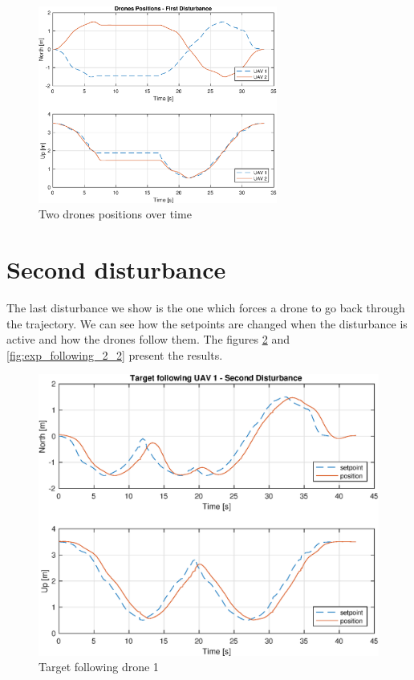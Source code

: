 \begin{figure}
\centering
\includegraphics[width=0.7\textwidth]{chapters/chapter-05/figures/overlapped_1.eps}
\caption{Two drones positions over time}
\label{fig:exp_overlapped_1}
\end{figure}

\section{Second disturbance}
The last disturbance we show is the one which forces a drone to go back through the
trajectory. We can see how the setpoints are changed when the disturbance is active
and how the drones follow them. The figures \ref{fig:exp_following_1_2}
and \ref{fig:exp_following_2_2} present the results.

\begin{figure}
\centering
\includegraphics[width=0.7\linewidth]{chapters/chapter-05/figures/following_1_2.eps}
\caption{Target following drone 1}
\label{fig:exp_following_1_2}
\end{figure}

